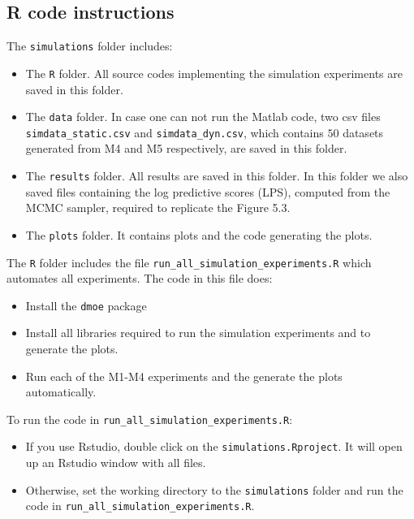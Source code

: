 \documentclass[
]{article}
\providecommand{\tightlist}{%
  \setlength{\itemsep}{0pt}\setlength{\parskip}{0pt}}
\begin{document}
\hypertarget{r-code-instructions}{%
\subsection{R code instructions}\label{r-code-instructions}}

The \texttt{simulations} folder includes:

\begin{itemize}
\tightlist
\item
  The \texttt{R} folder. All source codes implementing the simulation
  experiments are saved in this folder.
\item
  The \texttt{data} folder. In case one can not run the Matlab code, two
  csv files \texttt{simdata\_static.csv} and \texttt{simdata\_dyn.csv},
  which contains \(50\) datasets generated from M4 and M5 respectively,
  are saved in this folder.
\item
  The \texttt{results} folder. All results are saved in this folder. In
  this folder we also saved files containing the log predictive scores
  (LPS), computed from the MCMC sampler, required to replicate the
  Figure 5.3.
\item
  The \texttt{plots} folder. It contains plots and the code generating
  the plots.
\end{itemize}

The \texttt{R} folder includes the file
\texttt{run\_all\_simulation\_experiments.R} which automates all
experiments. The code in this file does:

\begin{itemize}
\tightlist
\item
  Install the \texttt{dmoe} package
\item
  Install all libraries required to run the simulation experiments and
  to generate the plots.
\item
  Run each of the M1-M4 experiments and the generate the plots
  automatically.
\end{itemize}

To run the code in \texttt{run\_all\_simulation\_experiments.R}:

\begin{itemize}
\tightlist
\item
  If you use Rstudio, double click on the \texttt{simulations.Rproject}.
  It will open up an Rstudio window with all files.\\
\item
  Otherwise, set the working directory to the \texttt{simulations}
  folder and run the code in
  \texttt{run\_all\_simulation\_experiments.R}.
\end{itemize}
\end{document}
